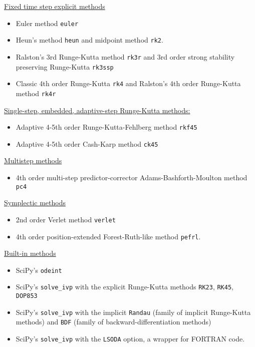 \documentclass[11pt, a4paper]{article}
\begin{document}
\vspace{2mm}
\underline{Fixed time step explicit methods}
\begin{itemize}
	\item Euler method \texttt{euler}
	
	\item Heun's method \texttt{heun} and midpoint method \texttt{rk2}.
	
	\item Ralston's 3rd Runge-Kutta method \texttt{rk3r} and 3rd order strong stability preserving Runge-Kutta  \texttt{rk3ssp}
	
	\item Classic 4th order Runge-Kutta \texttt{rk4} and Ralston's 4th order Runge-Kutta method \texttt{rk4r}
	
\end{itemize}

\vspace{2mm}
\underline{Single-step, embedded, adaptive-step Runge-Kutta methods:}
\begin{itemize}
	
	\item Adaptive 4-5th order Runge-Kutta-Fehlberg method \texttt{rkf45}
	
	\item Adaptive 4-5th order Cash-Karp method \texttt{ck45}

\end{itemize}

\underline{Multistep methods}
\begin{itemize}
	\item 4th order multi-step predictor-corrector Adams-Bashforth-Moulton method \texttt{pc4}
\end{itemize}

\underline{Symplectic methods}
\begin{itemize}
	\item 2nd order Verlet method \texttt{verlet}
	
	\item 4th order position-extended Forest-Ruth-like method \texttt{pefrl}.
\end{itemize}


\underline{Built-in methods}
\begin{itemize}
	\item SciPy's \texttt{odeint}
	\item SciPy's \texttt{solve\_ivp} with the explicit Runge-Kutta methods \texttt{RK23},  \texttt{RK45}, \texttt{DOP853}
	
	\item SciPy's \texttt{solve\_ivp} with the implicit \texttt{Randau} (family of implicit Runge-Kutta methods) and \texttt{BDF} (family of backward-differentiation methods)
	
	\item SciPy's \texttt{solve\_ivp} with the \texttt{LSODA} option, a wrapper for FORTRAN code. 
	
\end{itemize}
\end{document}
